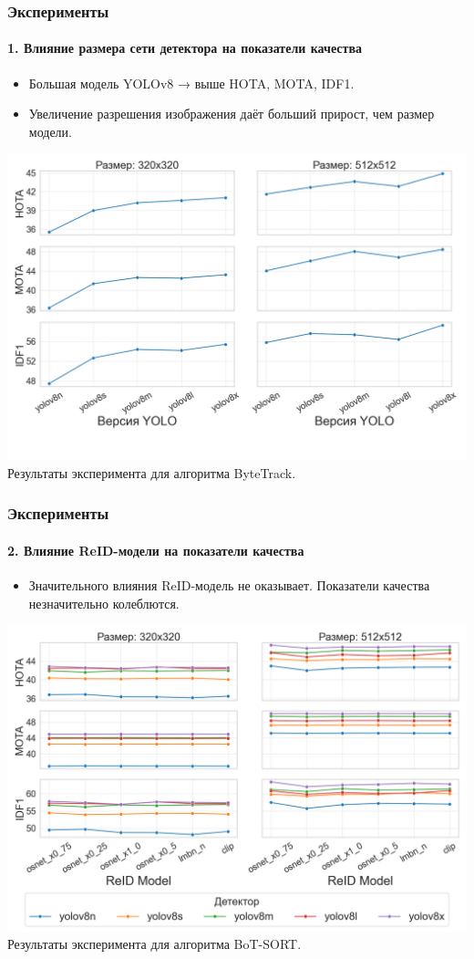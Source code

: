 \documentclass{beamer} %
\begin{document}
\begin{frame}
    \frametitle{Эксперименты}
    \framesubtitle{1. Влияние размера сети детектора на показатели качества}
    \begin{itemize}
      \item Большая модель YOLOv8 → выше HOTA, MOTA, IDF1.
      \item Увеличение разрешения изображения даёт больший прирост, чем размер модели.
    \end{itemize}
    \centering
    \includegraphics[width=0.7\linewidth]{images/plots/yolo_size_vs_metric/ByteTrack.png}\\
    \small Результаты эксперимента для алгоритма ByteTrack.
\end{frame}

\begin{frame}
  \frametitle{Эксперименты}
  \framesubtitle{2. Влияние ReID-модели на показатели качества}
  \begin{itemize}
    \item Значительного влияния ReID-модель не оказывает. Показатели качества незначительно колеблются.
  \end{itemize}
  \centering
  \includegraphics[width=0.7\linewidth]{images/plots/yolo_size_and_reid_vs_metric/BoT-SORT.png}\\
  \small Результаты эксперимента для алгоритма BoT-SORT.
\end{frame}
\end{document}
